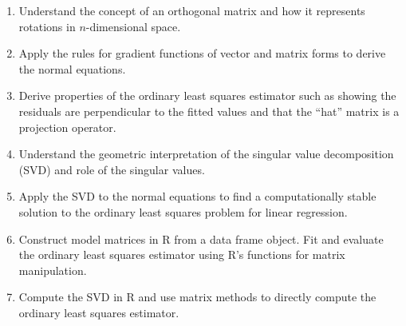 \documentclass[11pt]{article}
\begin{document}
\begin{enumerate}
\item Understand the concept of an orthogonal matrix and how it represents
rotations in $n$-dimensional space.

\item Apply the rules for gradient functions of vector and matrix forms to
derive the normal equations.

\item Derive properties of the ordinary least squares estimator such as
showing the residuals are perpendicular to the fitted values and that the
``hat'' matrix is a projection operator.

\item Understand the geometric interpretation of the singular value
decomposition (SVD) and role of the singular values.

\item Apply the SVD to the normal equations to find a computationally stable
solution to the ordinary least squares problem for linear regression.

\item Construct model matrices in R from a data frame object. Fit and evaluate
the ordinary least squares estimator using R's functions for matrix manipulation.

\item Compute the SVD in R and use matrix methods to directly compute the
ordinary least squares estimator.

\end{enumerate}
\end{document}
